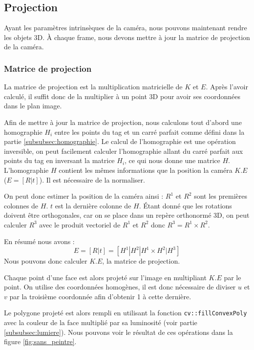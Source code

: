         \subsection{Projection}
        \label{subsec:projection}
            Ayant les paramètres intrinsèques de la caméra, nous pouvons maintenant rendre les objets 3D. À chaque frame, nous devons mettre à jour la matrice de projection de la caméra.

            \subsubsection{Matrice de projection}
                La matrice de projection est la multiplication matricielle de $K$ et $E$. Après l'avoir calculé, il suffit donc de la multiplier à un point 3D pour avoir ses coordonnées dans le plan image.

                Afin de mettre à jour la matrice de projection, nous calculons tout d'abord une homographie $H_i$ entre les points du tag et un carré parfait comme défini dans la partie \ref{subsubsec:homographie}. Le calcul de l'homographie est une opération inversible, on peut facilement calculer l'homographie allant du carré parfait aux points du tag en inversant la matrice $H_i$, ce qui nous donne une matrice $H$. L'homographie $H$ contient les mêmes informations que la position la caméra $K.E$ ($E = [R|t]$). Il est nécessaire de la normaliser. 

                On peut donc estimer la position de la caméra ainsi :
                $R^1$ et $R^2$ sont les premières colonnes de $H$. $t$ est la dernière colonne de $H$. Étant donné que les rotations doivent être orthogonales, car on se place dans un repère orthonormé 3D, on peut calculer $R^3$ avec le produit vectoriel de $R^1$ et $R^2$ donc $R^3 = R^1 \times R^2$.

                En résumé nous avons :
                \begin{equation*}
                    E = [R|t] = [H^1 | H^2 | H^1\times H^2 | H^3]
                \end{equation*}
                Nous pouvons donc calculer $K.E$, la matrice de projection.
                
                Chaque point d'une face est alors projeté sur l'image en multipliant $K.E$ par le point. On utilise des coordonnées homogènes, il est donc nécessaire de diviser $u$ et $v$ par la troisième coordonnée afin d'obtenir 1 à cette dernière. 

                Le polygone projeté est alors rempli en utilisant la fonction \verb|cv::fillConvexPoly| avec la couleur de la face multiplié par sa luminosité (voir partie \ref{subsubsec:lumiere}). Nous pouvons voir le résultat de ces opérations dans la figure \ref{fig:sans_peintre}.

